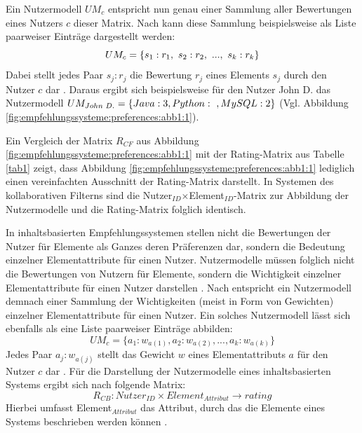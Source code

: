 Ein Nutzermodell $UM_{c}$ entspricht nun genau einer Sammlung aller Bewertungen eines Nutzers $c$ dieser Matrix.
Nach \textcite[S. 41]{berkovsky:2:article} kann diese Sammlung beispielsweise als Liste paarweiser Einträge dargestellt werden:
\begin{equation}\label{eq6}
    UM_{c} = \{s_{1}:r_{1},\textnormal{ }s_{2}:r_{2},\textnormal{ }...,\textnormal{ }s_{k}:r_{k}\}
\end{equation}
Dabei stellt jedes Paar $s_{j}:r_{j}$ die Bewertung $r_{j}$ eines Elements $s_{j}$ durch den Nutzer $c$ dar \cite[S. 41]{berkovsky:2:article}.
Daraus ergibt sich beispielsweise für den Nutzer John D. das Nutzermodell $UM_{John\textnormal{ }D.} = \{Java: 3, Python:\textnormal{ }, MySQL: 2\}$ (Vgl. Abbildung \ref{fig:empfehlungssysteme:preferences:abb1:1}).

Ein Vergleich der Matrix $R_{CF}$ aus Abbildung \ref{fig:empfehlungssysteme:preferences:abb1:1} mit der Rating-Matrix aus Tabelle \ref{tab1} zeigt, dass Abbildung \ref{fig:empfehlungssysteme:preferences:abb1:1} lediglich einen vereinfachten Ausschnitt der Rating-Matrix darstellt.
In Systemen des kollaborativen Filterns sind die Nutzer$_{ID}$$\times$Element$_{ID}$-Matrix zur Abbildung der Nutzermodelle und die Rating-Matrix folglich identisch.

In inhaltsbasierten Empfehlungssystemen stellen nicht die Bewertungen der Nutzer für Elemente als Ganzes deren Präferenzen dar, sondern die Bedeutung einzelner Elementattribute für einen Nutzer.
Nutzermodelle müssen folglich nicht die Bewertungen von Nutzern für Elemente, sondern die Wichtigkeit einzelner Elementattribute für einen Nutzer darstellen \cite[S. 42]{berkovsky:2:article}.
Nach \textcite[S. 42]{berkovsky:2:article} entspricht ein Nutzermodell demnach einer Sammlung der Wichtigkeiten (meist in Form von Gewichten) einzelner Elementattribute für einen Nutzer.
Ein solches Nutzermodell lässt sich ebenfalls als eine Liste paarweiser Einträge abbilden:
\begin{equation}\label{eq7}
    UM_{c} = \{a_{1}:w_{a(1)}, a_{2}:w_{a(2)}, ..., a_{k}:w_{a(k)}\}
\end{equation}
Jedes Paar $a_{j}:w_{a(j)}$ stellt das Gewicht $w$ eines Elementattributs $a$ für den Nutzer $c$ dar \cite[S. 42]{berkovsky:2:article}.
Für die Darstellung der Nutzermodelle eines inhaltsbasierten Systems ergibt sich nach \textcite[S. 251]{berkovsky:article} folgende Matrix:
\begin{equation}\label{eq8}
    R_{CB}: Nutzer_{ID} \times Element_{Attribut} \rightarrow rating
\end{equation}
Hierbei umfasst Element$_{Attribut}$ das Attribut, durch das die Elemente eines Systems beschrieben werden können \cite[S. 251]{berkovsky:article}.

